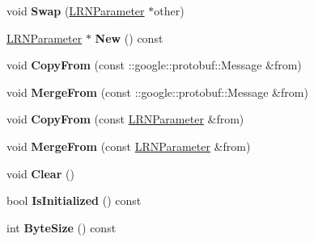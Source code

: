 \begin{DoxyCompactItemize}
\item 
\mbox{\label{classcaffe_1_1_l_r_n_parameter_af36f6e9ee5492cecb4d5256ed03058fa}} 
void {\bfseries Swap} (\mbox{\hyperlink{classcaffe_1_1_l_r_n_parameter}{L\+R\+N\+Parameter}} $\ast$other)
\item 
\mbox{\label{classcaffe_1_1_l_r_n_parameter_a94225694357eac479790362ae567d80c}} 
\mbox{\hyperlink{classcaffe_1_1_l_r_n_parameter}{L\+R\+N\+Parameter}} $\ast$ {\bfseries New} () const
\item 
\mbox{\label{classcaffe_1_1_l_r_n_parameter_ad26b983fe4d4aaf8e3389cb8b1237542}} 
void {\bfseries Copy\+From} (const \+::google\+::protobuf\+::\+Message \&from)
\item 
\mbox{\label{classcaffe_1_1_l_r_n_parameter_af6a640fcc3b3b7baf8274040fad58307}} 
void {\bfseries Merge\+From} (const \+::google\+::protobuf\+::\+Message \&from)
\item 
\mbox{\label{classcaffe_1_1_l_r_n_parameter_a40a976b504944c0588a79371b568a969}} 
void {\bfseries Copy\+From} (const \mbox{\hyperlink{classcaffe_1_1_l_r_n_parameter}{L\+R\+N\+Parameter}} \&from)
\item 
\mbox{\label{classcaffe_1_1_l_r_n_parameter_a35d935475db9414b1cb34db9d95a2bb8}} 
void {\bfseries Merge\+From} (const \mbox{\hyperlink{classcaffe_1_1_l_r_n_parameter}{L\+R\+N\+Parameter}} \&from)
\item 
\mbox{\label{classcaffe_1_1_l_r_n_parameter_a816269e807a9af64c744477914be510c}} 
void {\bfseries Clear} ()
\item 
\mbox{\label{classcaffe_1_1_l_r_n_parameter_afef3b6bd02c156e16b3909f3689fac7c}} 
bool {\bfseries Is\+Initialized} () const
\item 
\mbox{\label{classcaffe_1_1_l_r_n_parameter_aa256a5df5bdd0d4024273549d7645a93}} 
int {\bfseries Byte\+Size} () const
\item 
\mbox{\label{classcaffe_1_1_l_r_n_parameter_a5f86ec9e16e36d5464b222bdd5731bdb}} 

\end{DoxyCompactItemize}
